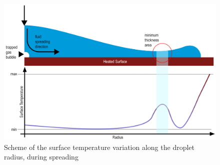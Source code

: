 \begin{figure}[h]
\centering
\includegraphics[width=1\linewidth]{Figures/2.Chapter/tempvar.png}
\caption {Scheme of the surface temperature variation along the droplet radius, during spreading}
\label{fig:tempvar}
\end{figure}


